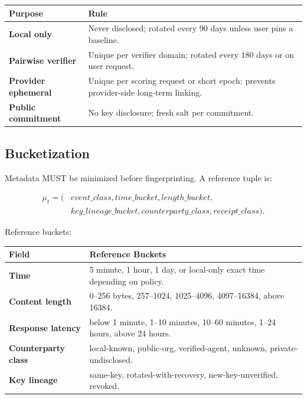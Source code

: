 \documentclass[11pt]{article}
\begin{document}
\begin{center}
\begin{tabularx}{\textwidth}{>{\bfseries}p{} X}
\toprule
Purpose & Rule \\
\midrule
Local only & Never disclosed; rotated every 90 days unless user pins a baseline. \\
Pairwise verifier & Unique per verifier domain; rotated every 180 days or on user request. \\
Provider ephemeral & Unique per scoring request or short epoch; prevents provider-side long-term linking. \\
Public commitment & No key disclosure; fresh salt per commitment. \\
\bottomrule
\end{tabularx}
\end{center}

\subsection{Bucketization}

Metadata MUST be minimized before fingerprinting. A reference tuple is:

\begin{equation}
\begin{aligned}
\mu_t=(&event\_class, time\_bucket, length\_bucket,\\
&key\_lineage\_bucket, counterparty\_class, receipt\_class).
\end{aligned}
\end{equation}

Reference buckets:

\begin{center}
\begin{tabularx}{\textwidth}{>{\bfseries}p{} X}
\toprule
Field & Reference Buckets \\
\midrule
Time & 5 minute, 1 hour, 1 day, or local-only exact time depending on policy. \\
Content length & 0--256 bytes, 257--1024, 1025--4096, 4097--16384, above 16384. \\
Response latency & below 1 minute, 1--10 minutes, 10--60 minutes, 1--24 hours, above 24 hours. \\
Counterparty class & local-known, public-org, verified-agent, unknown, private-undisclosed. \\
Key lineage & same-key, rotated-with-recovery, new-key-unverified, revoked. \\
\bottomrule
\end{tabularx}
\end{center}
\end{document}
